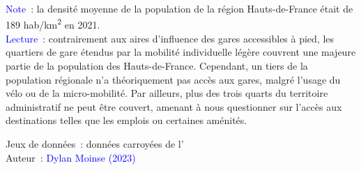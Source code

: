 \begin{table}[h!]
        \begin{flushleft}\scriptsize{
        \textcolor{blue}{Note~:} la densité moyenne de la population de la région Hauts-de-France était de 189 hab/km\textsuperscript{2} en 2021.
        \\
        \textcolor{blue}{Lecture~:} contrairement aux aires d'influence des gares accessibles à pied, les quartiers de gare étendus par la mobilité individuelle légère couvrent une majeure partie de la population des Hauts-de-France. Cependant, un tiers de la population régionale n'a théoriquement pas accès aux gares, malgré l'usage du vélo ou de la micro-mobilité. Par ailleurs, plus des trois quarts du territoire administratif ne peut être couvert, amenant à nous questionner sur l'accès aux destinations telles que les emplois ou certaines aménités.
        }\end{flushleft}
        \begin{flushright}\scriptsize
        Jeux de données~: données carroyées de l'\textcolor{blue}{\textcite{insee_grille_2021}}
        \\
        Auteur~: \textcolor{blue}{Dylan Moinse (2023)}
        \end{flushright}
        \end{table}